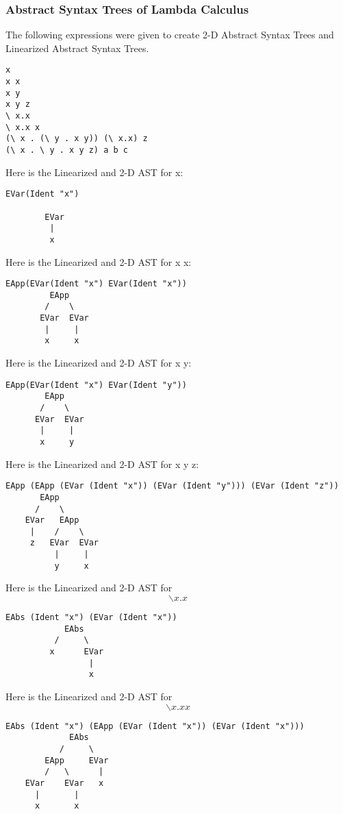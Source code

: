 \documentclass{article}
\theoremstyle{theorem}
\theoremstyle{definition}
\theoremstyle{remark}
\begin{document}
\subsubsection{Abstract Syntax Trees of Lambda Calculus}
The following expressions were given to create 2-D Abstract Syntax Trees and Linearized Abstract Syntax Trees.
\begin{verbatim}
x
x x
x y
x y z
\ x.x
\ x.x x
(\ x . (\ y . x y)) (\ x.x) z
(\ x . \ y . x y z) a b c
\end{verbatim}
\noindent\newline Here is the Linearized and 2-D AST for x:
\begin{verbatim}
EVar(Ident "x")

        EVar
         |
         x
\end{verbatim}
\noindent\newline Here is the Linearized and 2-D AST for x x:
\begin{verbatim}
EApp(EVar(Ident "x") EVar(Ident "x"))
         EApp
        /    \
       EVar  EVar
        |     |
        x     x 
\end{verbatim}
\noindent\newline Here is the Linearized and 2-D AST for x y:
\begin{verbatim}
EApp(EVar(Ident "x") EVar(Ident "y"))
        EApp
       /    \
      EVar  EVar
       |     |
       x     y
\end{verbatim}
\noindent\newline Here is the Linearized and 2-D AST for x y z:
\begin{verbatim}
EApp (EApp (EVar (Ident "x")) (EVar (Ident "y"))) (EVar (Ident "z"))
       EApp
      /    \
    EVar   EApp
     |    /    \
     z   EVar  EVar
          |     |
          y     x
\end{verbatim}
\noindent\newline Here is the Linearized and 2-D AST for $$\backslash x. x$$
\begin{verbatim}
EAbs (Ident "x") (EVar (Ident "x"))
            EAbs
          /     \
         x      EVar
                 |
                 x
\end{verbatim}
\noindent\newline Here is the Linearized and 2-D AST for $$\backslash x. x x$$
\begin{verbatim}
EAbs (Ident "x") (EApp (EVar (Ident "x")) (EVar (Ident "x")))
             EAbs
           /     \
        EApp     EVar
        /   \      |
    EVar    EVar   x
      |       |
      x       x
\end{verbatim}
\end{document}
